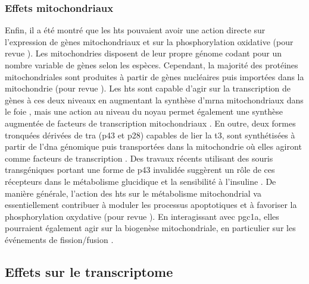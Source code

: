 \documentclass[../main.tex]{subfiles}
\begin{document}
		\subsubsection{Effets mitochondriaux}
			Enfin, il a été montré que les \glspl{ht} pouvaient avoir une action directe sur l'expression de gènes mitochondriaux et sur la phosphorylation oxidative (pour revue \citealp{Wrutniak-Cabello2001}).
			Les mitochondries disposent de leur propre génome codant pour un nombre variable de gènes selon les espèces.
			Cependant, la majorité des protéines mitochondriales sont produites à partir de gènes nucléaires puis importées dans la mitochondrie (pour revue \citealp{Schaffer2007}).
			Les \glspl{ht} sont capable d'agir sur la transcription de gènes à ces deux niveaux en augmentant la synthèse d’\gls{mrna} mitochondriaux dans le foie \citep{Enriquez1999}, mais une action au niveau du noyau permet également une synthèse augmentée de facteurs de transcription mitochondriaux \citep{Garstka1994}.
			En outre, deux formes tronquées dérivées de \gls{tra} (p43 et p28) capables de lier la \gls{t3}, sont synthétisées à partir de l'\gls{dna} génomique puis transportées dans la mitochondrie où elles agiront comme facteurs de transcription \citep{Wrutniak1995}.
			Des travaux récents utilisant des souris transgéniques portant une forme de p43 invalidée suggèrent un rôle de ces récepteurs dans le métabolisme glucidique et la sensibilité à l'insuline \citep{Bertrand2013}.
			De manière générale, l'action des \glspl{ht} sur le métabolisme mitochondrial va essentiellement contribuer à moduler les processus apoptotiques et à favoriser la phosphorylation oxydative (pour revue \citealp{Psarra2008}).
			En interagissant avec \gls{pgc1a}, elles pourraient également agir sur la biogenèse mitochondriale, en particulier sur les événements de fission/fusion \citep{Ventura-Clapier2008}.


	\subsection{Effets sur le transcriptome}
\end{document}

